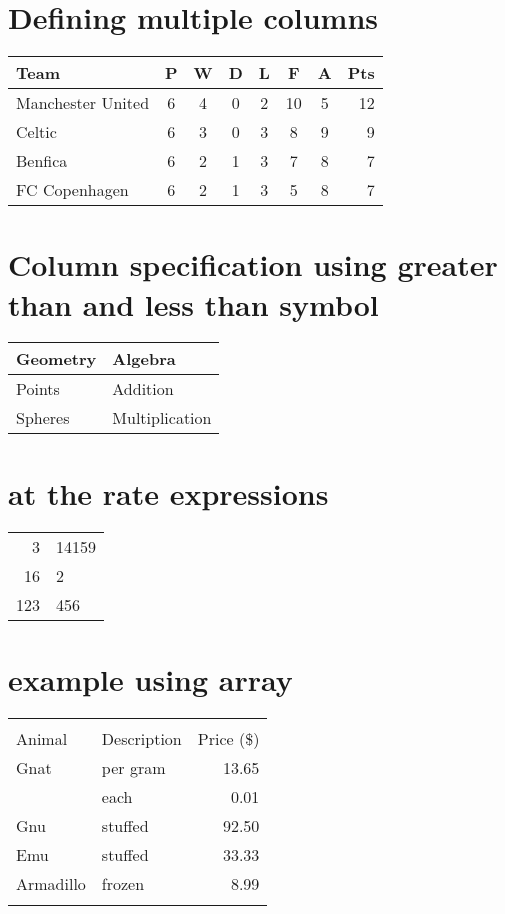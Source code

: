 \documentclass{article}
\begin{document}
\section{Defining multiple columns}
\begin{tabular}{l*{6}{c}r}
Team              & P & W & D & L & F  & A & Pts \\
\hline
Manchester United & 6 & 4 & 0 & 2 & 10 & 5 & 12  \\
Celtic            & 6 & 3 & 0 & 3 &  8 & 9 &  9  \\
Benfica           & 6 & 2 & 1 & 3 &  7 & 8 &  7  \\
FC Copenhagen     & 6 & 2 & 1 & 3 &  5 & 8 &  7  \\
\end{tabular}

\section{Column specification using greater than and less than symbol}
\begin{tabular}{>{\centering}p{3.5cm}<{\centering}p{3.5cm} }
Geometry  & Algebra
\tabularnewline
\hline
 Points & Addition 
\tabularnewline
 Spheres & Multiplication 
\end{tabular}

\section{at the rate expressions}
\begin{tabular}{r@{.}l}
  3   & 14159 \\
  16  & 2     \\
  123 & 456   \\
\end{tabular}

\section{example using array}

\begin{tabular}{llr}
\firsthline
\multicolumn{2}{c}{Item} \\
\cline{1-2}
Animal    & Description & Price (\$) \\
\hline
Gnat      & per gram    & 13.65      \\
          & each        & 0.01       \\
Gnu       & stuffed     & 92.50      \\
Emu       & stuffed     & 33.33      \\
Armadillo & frozen      & 8.99       \\
\lasthline
\end{tabular}
\end{document}
